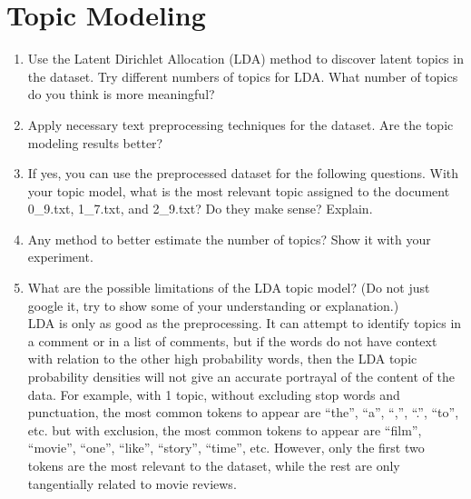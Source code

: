\documentclass[conference]{IEEEtran}
\begin{document}
\section{Topic Modeling}
\begin{enumerate}
    \item Use the Latent Dirichlet Allocation (LDA) method to discover latent topics in the dataset. Try different numbers of topics for LDA. What number of topics do you think is more meaningful?\\
    \item Apply necessary text preprocessing techniques for the dataset. Are the topic modeling results better?\\
    \item If yes, you can use the preprocessed dataset for the following questions. With your topic model, what is the most relevant topic assigned to the document 0\_9.txt, 1\_7.txt, and 2\_9.txt? Do they make sense? Explain.\\
    \item Any method to better estimate the number of topics? Show it with your experiment.\\
    \item What are the possible limitations of the LDA topic model? (Do not just google it, try to show some of your understanding or explanation.)\\
    LDA is only as good as the preprocessing. It can attempt to identify topics in a comment or in a list of comments, but if the words do not have context with relation to the other high probability words, then the LDA topic probability densities will not give an accurate portrayal of the content of the data. For example, with 1 topic, without excluding stop words and punctuation, the most common tokens to appear are “the”, “a”, “,”, “.”, “to”, etc. but with exclusion, the most common tokens to appear are “film”, “movie”, “one”, “like”, “story”, “time”, etc. However, only the first two tokens are the most relevant to the dataset, while the rest are only tangentially related to movie reviews.
    
\end{enumerate}
\newpage
\end{document}
